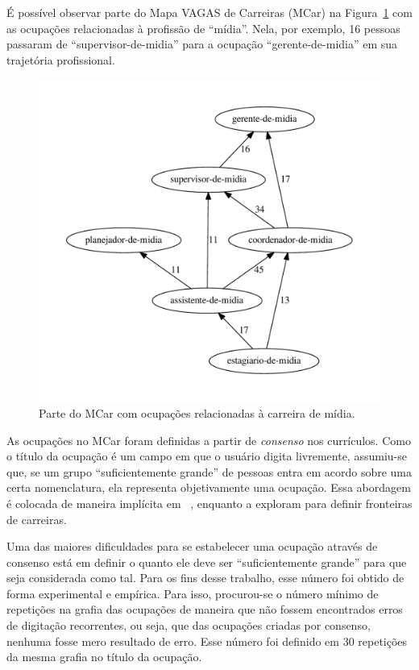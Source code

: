 \documentclass[
  article,
  11pt,
  a4paper,
  english,
  brazil,
  sumario=tradicional]{abntex2}
\begin{document}
É possível observar parte do Mapa VAGAS de Carreiras (MCar) na Figura~\ref{fig:ex-mapa-midia} com as ocupações relacionadas à profissão de \enquote{mídia}. Nela, por exemplo, 16 pessoas passaram de \enquote{supervisor-de-midia} para a ocupação \enquote{gerente-de-midia} em sua trajetória profissional.

\begin{figure}[ht]
  \centering
  \includegraphics[scale=0.6]{cluster_23.pdf}
  \caption{Parte do MCar com ocupações relacionadas à carreira de mídia.}
  \label{fig:ex-mapa-midia}
\end{figure}

As ocupações no MCar foram definidas a partir de \textit{consenso} nos currículos. Como o título da ocupação é um campo em que o usuário digita livremente, assumiu-se que, se um grupo \enquote{suficientemente grande} de pessoas entra em acordo sobre uma certa nomenclatura, ela representa objetivamente uma ocupação. Essa abordagem é colocada de maneira implícita em ~, enquanto  a exploram para definir fronteiras de carreiras.

Uma das maiores dificuldades para se estabelecer uma ocupação através de consenso está em definir o quanto ele deve ser \enquote{suficientemente grande} para que seja considerada como tal. Para os fins desse trabalho, esse número foi obtido de forma experimental e empírica. Para isso, procurou-se o número mínimo de repetições na grafia das ocupações de maneira que não fossem encontrados erros de digitação recorrentes, ou seja, que das ocupações criadas por consenso, nenhuma fosse mero resultado de erro. Esse número foi definido em 30 repetições da mesma grafia no título da ocupação.
\end{document}
